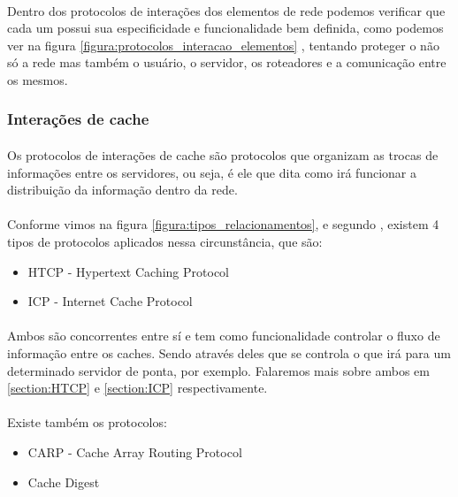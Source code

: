 \paragraph{} Dentro dos protocolos de intera\c{c}\~oes dos elementos de rede podemos verificar que cada um possui sua especificidade e funcionalidade bem definida, como podemos ver na figura \ref{figura:protocolos_interacao_elementos} , tentando proteger o n\~ao s\'o a rede mas tamb\'em o usu\'ario, o servidor, os roteadores e a comunica\c{c}\~ao entre os mesmos.


\subsubsection{Intera\c{c}\~oes de cache}

\paragraph{} Os protocolos de intera\c{c}\~oes de cache s\~ao protocolos que organizam as trocas de informa\c{c}\~oes entre os servidores, ou seja, \'e ele que dita como ir\'a funcionar a distribui\c{c}\~ao da informa\c{c}\~ao dentro da rede.
\paragraph{} Conforme vimos na figura \ref{figura:tipos_relacionamentos}, e segundo \cite{pathan2007taxonomy}, existem 4 tipos de protocolos aplicados nessa circunst\^ancia, que s\~ao:
\begin{itemize}
\item HTCP - Hypertext Caching Protocol
\item ICP - Internet Cache Protocol
\end{itemize}
\paragraph{} Ambos s\~ao concorrentes entre s\'i e tem como funcionalidade controlar o fluxo de informa\c{c}\~ao entre os caches. Sendo atrav\'es deles que se controla o que ir\'a para um determinado servidor de ponta, por exemplo. Falaremos mais sobre ambos em \ref{section:HTCP} e \ref{section:ICP} respectivamente.
\paragraph{} Existe tamb\'em os protocolos:
\begin{itemize}
\item CARP -  Cache Array Routing Protocol
\item Cache Digest
\end{itemize}
